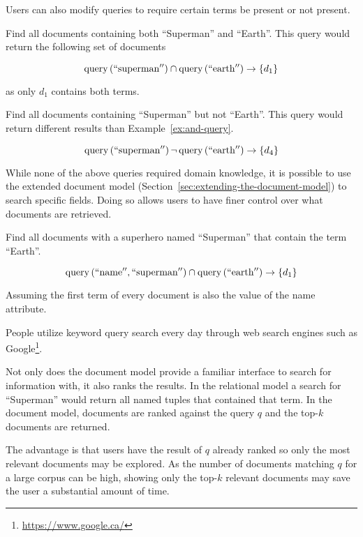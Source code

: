 		Users can also modify queries to require certain terms be present or not present.
		
		\begin{ex}
		\label{ex:and-query}
			Find all documents containing both ``Superman'' and ``Earth''.  This query would return the following set of documents
			
			$$\operatorname{query}\left(\mathrm{``superman''}\right) \cap \operatorname{query}\left(\mathrm{``earth''}\right) \rightarrow \left\{d_1\right\}$$
			
			as only $d_1$ contains both terms.
		\end{ex}
		
		\begin{ex}
			Find all documents containing ``Superman'' but not ``Earth''.  This query would return different results than Example~\ref{ex:and-query}.
			
			$$\operatorname{query}\left(\mathrm{``superman''}\right) \neg\operatorname{query}\left(\mathrm{``earth''}\right) \rightarrow \left\{d_4\right\}$$
		\end{ex}
		
		While none of the above queries required domain knowledge, it is possible to use the extended document model (Section~\ref{sec:extending-the-document-model}) to search specific fields.  Doing so allows users to have finer control over what documents are retrieved.
		
		\begin{ex}
			Find all documents with a superhero named ``Superman'' that contain the term ``Earth''.
			
			$$\operatorname{query}\left(\mathrm{``name''}, \mathrm{``superman''}\right) \cap \operatorname{query}\left(\mathrm{``earth''}\right) \rightarrow \left\{d_1\right\}$$
			
			Assuming the first term of every document is also the value of the name attribute.
		\end{ex}
		
		People utilize keyword query search every day through web search engines such as Google\footnote{\url{https://www.google.ca/}}.
		
		Not only does the document model provide a familiar interface to search for information with, it also ranks the results.  In the relational model a search for ``Superman'' would return all named tuples that contained that term.  In the document model, documents are ranked against the query $q$ and the top-$k$ documents are returned.
		
		The advantage is that users have the result of $q$ already ranked so only the most relevant documents may be explored.  As the number of documents matching $q$ for a large corpus can be high, showing only the top-$k$ relevant documents may save the user a substantial amount of time.
		
